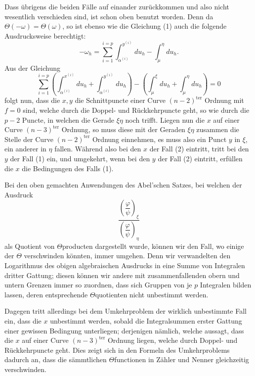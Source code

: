 \documentclass[10pt]{article}
\begin{document}
Dass übrigens die beiden Fälle auf einander zurückkommen und also nicht wesentlich verschieden sind, ist schon oben benutzt worden. Denn da \(\Theta(-\omega)=\Theta(\omega)\), so ist ebenso wie die Gleichung (1) auch die folgende Ausdrucksweise berechtigt:
\[
\tag{2}
-\omega_h=\sum_{i=1}^{i=p}\int_{\alpha^{(i)}}^{y^{(i)}}du_h-\int_{\mu}^{\eta}du_h .
\]
Aus der Gleichung
\[
\sum_{i=1}^{i=p}\left(\int_{\alpha^{(i)}}^{x^{(i)}}du_h+
\int_{\alpha^{(i)}}^{y^{(i)}}du_h\right)-
\left(\int_{\mu}^{\xi}du_h+\int_{\mu}^{\eta}du_h\right)=0
\]
folgt nun, dass die \(x,y\) die Schnittpuncte einer Curve \((n-2)^{\mathrm{ter}}\) Ordnung mit \(f=0\) sind, welche durch die Doppel- und Rückkehrpuncte geht, so wie durch die \(p-2\) Puncte, in welchen die Gerade \(\xi\eta\) noch trifft. Liegen nun die \(x\) auf einer Curve \((n-3)^{\mathrm{ter}}\) Ordnung, so muss diese mit der Geraden \(\xi\eta\) zusammen die Stelle der Curve \((n-2)^{\mathrm{ter}}\) Ordnung einnehmen, es muss also ein Punct \(y\) in \(\xi\), ein anderer in \(\eta\) fallen. Während also bei den \(x\) der Fall (2) eintritt, tritt bei den \(y\) der Fall (1) ein, und umgekehrt, wenn bei den \(y\) der Fall (2) eintritt, erfüllen die \(x\) die Bedingungen des Falls (1).

Bei den oben gemachten Anwendungen des Abel'schen Satzes, bei welchen der Ausdruck
\[
\frac{\left(\dfrac{\varphi}{\psi}\right)_{\xi}}
     {\left(\dfrac{\varphi}{\psi}\right)_{\eta}}
\]
als Quotient von \(\Theta\)producten dargestellt wurde, können wir den Fall, wo einige der \(\Theta\) verschwinden könnten, immer umgehen. Denn wir verwandelten den Logarithmus des obigen algebraischen Ausdrucks in eine Summe von Integralen dritter Gattung; diesen können wir andere mit zusammenfallenden obern und untern Grenzen immer so zuordnen, dass sich Gruppen von je \(p\) Integralen bilden lassen, deren entsprechende \(\Theta\)quotienten nicht unbestimmt werden.

Dagegen tritt allerdings bei dem Umkehrproblem der wirklich unbestimmte Fall ein, dass die \(x\) unbestimmt werden, sobald die Integralsummen erster Gattung einer gewissen Bedingung unterliegen; derjenigen nämlich, welche aussagt, dass die \(x\) auf einer Curve \((n-3)^{\mathrm{ter}}\) Ordnung liegen, welche durch Doppel- und Rückkehrpuncte geht. Dies zeigt sich in den Formeln des Umkehrproblems dadurch an, dass die sämmtlichen \(\Theta\)functionen in Zähler und Nenner gleichzeitig verschwinden.
\end{document}
